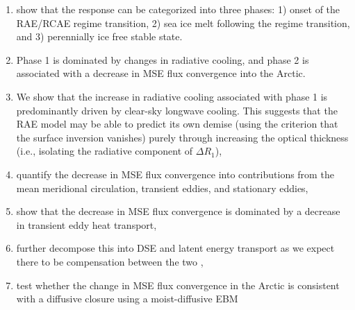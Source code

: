 \documentclass{article}
\begin{document}
\begin{itemize}
\begin{enumerate}
        \item show that the response can be categorized into three phases: 1) onset of the RAE/RCAE regime transition, 2) sea ice melt following the regime transition, and 3) perennially ice free stable state.
        \item Phase 1 is dominated by changes in radiative cooling, and phase 2 is associated with a decrease in MSE flux convergence into the Arctic.
        \item We show that the increase in radiative cooling associated with phase 1 is predominantly driven by clear-sky longwave cooling. This suggests that the RAE model \citep{cronin2016} may be able to predict its own demise (using the criterion that the surface inversion vanishes) purely through increasing the optical thickness (i.e., isolating the radiative component of $\Delta R_1$),
        \item quantify the decrease in MSE flux convergence into contributions from the mean meridional circulation, transient eddies, and stationary eddies,
        \item show that the decrease in MSE flux convergence is dominated by a decrease in transient eddy heat transport,
        \item further decompose this into DSE and latent energy transport as we expect there to be compensation between the two \citep{feldl2017},
        \item test whether the change in MSE flux convergence in the Arctic is consistent with a diffusive closure using a moist-diffusive EBM
    \end{enumerate}
\end{itemize}
\end{document}
